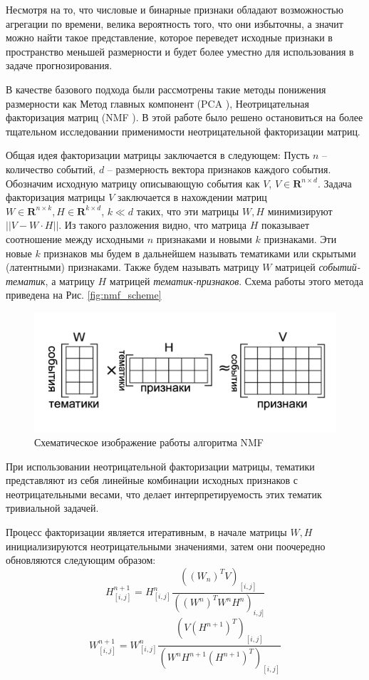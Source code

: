Несмотря на то, что числовые и бинарные признаки обладают возможностью агрегации по времени, велика вероятность того, что они избыточны, а значит можно найти такое представление, которое переведет исходные признаки в пространство меньшей размерности и будет более уместно для использования в задаче прогнозирования. 

В качестве базового подхода были рассмотрены такие методы понижения размерности как Метод главных компонент (PCA \cite{pca_orig}), Неотрицательная факторизация матриц (NMF \cite{nmf_orig}). В этой работе было решено остановиться на более тщательном исследовании применимости неотрицательной факторизации матриц. 

Общая идея факторизации матрицы заключается в следующем: 
Пусть $n$ -- количество событий, $d$ -- размерность вектора признаков каждого события. Обозначим исходную матрицу описывающую события как $V$, $V \in \mathbf{R}^{n \times d}$. Задача факторизация матрицы $V$ заключается в нахождении матриц $W \in \mathbf{R}^{n \times k}, H \in \mathbf{R}^{k \times d}$, $k \ll d$ таких, что эти матрицы $W, H$ минимизируют $||V - W \cdot H||$. Из такого разложения видно, что матрица $H$ показывает соотношение между исходными $n$ признаками и новыми $k$ признаками. Эти новые $k$ признаков мы будем в дальнейшем называть тематиками или скрытыми (латентными) признаками. Также будем называть матрицу $W$ матрицей \textit{событий-тематик}, а матрицу $H$ матрицей \textit{тематик-признаков}. Схема работы этого метода приведена на Рис. \ref{fig:nmf_scheme}
\begin{figure}
\centering
  \includegraphics[width=.9\linewidth]{images/nmf_scheme.png}
  \caption{Схематическое изображение работы алгоритма NMF}
  \label{fig:ae_arch}
\end{figure}
При использовании неотрицательной факторизации матрицы, тематики представляют из себя линейные комбинации исходных признаков с неотрицательными весами, что делает интерпретируемость этих тематик тривиальной задачей.

Процесс факторизации является итеративным, в начале матрицы $W, H$ инициализируются неотрицательными значениями, затем они поочередно обновляются следующим образом:
$$H^{n+1}_{[i,j]} = H^n_{[i,j]} \frac{((W_n)^TV)_{[i,j]}}{((W^n)^TW^nH^n)_{i,j]}}$$
$$W^{n+1}_{[i,j]} = W^n_{[i,j]} \frac{(V(H^{n+1})^T)_{[i,j]}}{(W^nH^{n+1}(H^{n+1})^T)_{[i,j]}}$$


